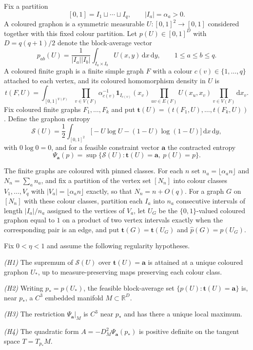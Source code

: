 \documentclass[11pt]{article}
\theoremstyle{definition}
\newcommand{\R}{\mathbb R}
\providecommand{\R}{\mathbb R}
\begin{document}
Fix a partition
\[
[0,1]=I_1\sqcup\cdots\sqcup I_q,
\qquad|I_a|=\alpha_a>0 .
\]
A coloured graphon is a symmetric measurable $U:[0,1]^2\to[0,1]$
considered together with this fixed colour partition.  Let
$p(U)\in[0,1]^D$ with $D=q(q+1)/2$ denote the block-average vector
\[
p_{ab}(U)=\frac1{|I_a||I_b|}\int_{I_a\times I_b}U(x,y)\,\mathrm
dx\,\mathrm dy,
\qquad 1\le a\le b\le q .
\]
A coloured finite graph is a finite simple graph $F$ with a colour
$c(v)\in\{1,\ldots,q\}$ attached to each vertex, and its coloured
homomorphism density in $U$ is
\[
t(F,U)=\int_{[0,1]^{V(F)}}
\prod_{v\in V(F)}\alpha_{c(v)}^{-1}\mathbf 1_{I_{c(v)}}(x_v)
\prod_{uv\in E(F)}U(x_u,x_v)
\prod_{v\in V(F)}\mathrm dx_v .
\]
Fix coloured finite graphs $F_1,\ldots,F_k$ and put
$\mathbf t(U)=(t(F_1,U),\ldots,t(F_k,U))$.  Define the graphon entropy
\[
\mathcal S(U)=\frac12\int_{[0,1]^2}
\bigl[-U\log U-(1-U)\log(1-U)\bigr]\,\mathrm dx\,\mathrm dy,
\]
with $0\log0=0$, and for a feasible constraint vector $\mathbf a$ the
contracted entropy
\[
\Psi_{\mathbf a}(p)=\sup\{\mathcal S(U):
\mathbf t(U)=\mathbf a,\ p(U)=p\}.
\]

The finite graphs are coloured with pinned classes.  For each $n$ set
$n_a=\lfloor\alpha_an\rfloor$ and $N_n=\sum_an_a$, and fix a partition
of the vertex set $[N_n]$ into colour classes $V_1,\ldots,V_q$ with
$|V_a|=\lfloor\alpha_an\rfloor$ exactly, so that $N_n=n+O(q)$.  For a
graph $G$ on $[N_n]$ with these colour classes, partition each $I_a$
into $n_a$ consecutive intervals of length $|I_a|/n_a$ assigned to the
vertices of $V_a$, let $U_G$ be the $\{0,1\}$-valued coloured graphon
equal to $1$ on a product of two vertex intervals exactly when the
corresponding pair is an edge, and put
$\mathbf t(G)=\mathbf t(U_G)$ and $\widehat p(G)=p(U_G)$.

Fix $0<\eta<1$ and assume the following regularity hypotheses.

\emph{(H1)} The supremum of $\mathcal S(U)$ over
$\mathbf t(U)=\mathbf a$ is attained at a unique coloured graphon
$U_*$, up to measure-preserving maps preserving each colour class.

\emph{(H2)} Writing $p_*=p(U_*)$, the feasible block-average set
$\{p(U):\mathbf t(U)=\mathbf a\}$ is, near $p_*$, a $C^3$ embedded
manifold $M\subset\R^D$.

\emph{(H3)} The restriction $\Psi_{\mathbf a}|_M$ is $C^3$ near $p_*$
and has there a unique local maximum.

\emph{(H4)} The quadratic form $A=-D^2_M\Psi_{\mathbf a}(p_*)$ is
positive definite on the tangent space $T=T_{p_*}M$.
\end{document}

